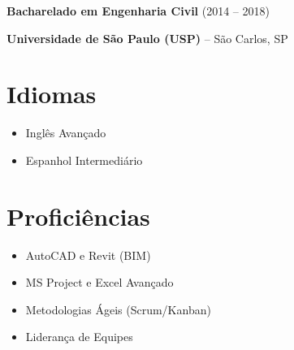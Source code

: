 \documentclass[11pt]{article}
\newcommand{\divider}{\textcolor{gray!30}{\hdashrule{\linewidth}{0.6pt}{0.5ex}}\medskip}
\newcommand{\cvitemshort}[4]{
	{\large \color{destaque} \textbf{#1} (#4)} \par
	\vspace{1mm}
	{\textbf{#2} -- #3} \par
	\vspace{4mm} 
}
\begin{document}
	\divider
	
	\cvitemshort{Bacharelado em Engenharia Civil}
	{Universidade de São Paulo (USP)}
	{São Carlos, SP}
	{2014 -- 2018}
	
	\vspace{2mm}
	
	\section*{Idiomas}
	\begin{itemize}[noitemsep, topsep=0pt, leftmargin=1.2em]
		\item Inglês Avançado
		\item Espanhol Intermediário
	\end{itemize}
	
	\vspace{3mm}
	
	\section*{Proficiências}
	\begin{itemize}[noitemsep, topsep=0pt, leftmargin=1.2em]
		\item AutoCAD e Revit (BIM)
		\item MS Project e Excel Avançado
		\item Metodologias Ágeis (Scrum/Kanban)
		\item Liderança de Equipes
	\end{itemize}
	
\end{document}
